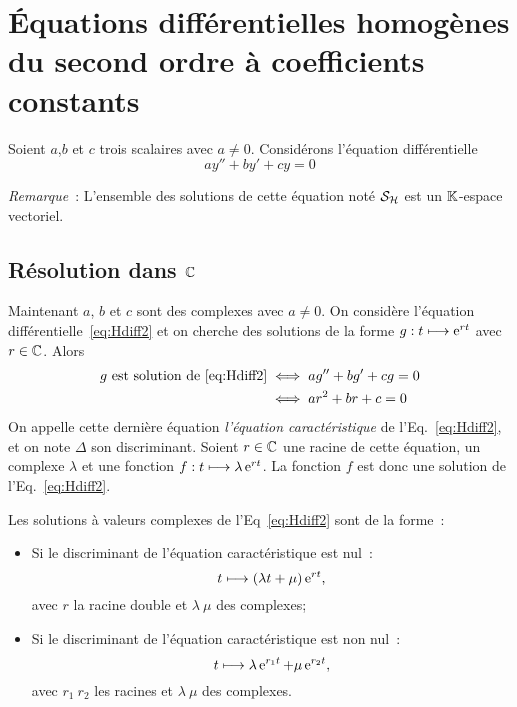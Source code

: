\section{Équations différentielles homogènes du second ordre à coefficients constants}
\label{sec:eqdiffsecondordrecoefconstants}
Soient $a$,$b$ et $c$ trois scalaires avec $a \neq 0$. Considérons l'équation différentielle
\begin{equation}
  \label{eq:Hdiff2}
  ay''+by'+cy=0
\end{equation}

\emph{Remarque}~: L'ensemble des solutions de cette équation noté $\mathcal{S}_{\mathcal{H}}$ est un $\mathbb{K}$-espace vectoriel.
%
\subsection{Résolution dans $\mathbb{C}$}
\label{subsec:resdansC}
Maintenant $a$, $b$ et $c$ sont des complexes avec $a \neq 0$. On considère l'équation différentielle~\eqref{eq:Hdiff2} et on cherche des solutions de la forme $g :t \longmapsto \operatorname{e}^{rt}$ avec $r \in \mathbb{C}$. Alors 
\begin{align}
  g\text{~est solution de } \eqref{eq:Hdiff2} & \iff ag'' + bg'+cg=0  \\ & \iff ar^2+br+c=0
\end{align}
On appelle cette dernière équation \emph{l'équation caractéristique} de l'Eq.~\eqref{eq:Hdiff2}, et on note $\Delta$ son discriminant. Soient $r \in \mathbb{C}$ une racine de cette équation, un complexe $\lambda$ et une fonction $f:t \longmapsto \lambda \operatorname{e}^{rt}$. La fonction $f$ est donc une solution de l'Eq.~\eqref{eq:Hdiff2}.
%
\begin{theo}
  \label{theo:5} 
  Les solutions à valeurs complexes de l'Eq~\eqref{eq:Hdiff2} sont de la forme~:
  \begin{itemize}
  \item Si le discriminant de l'équation caractéristique est nul~: 
    \begin{equation} 
      t \longmapsto (\lambda t + \mu)\operatorname{e}^{rt},
    \end{equation} 
    avec $r$ la racine double et $\lambda \ \mu$ des complexes;
  \item Si le discriminant de l'équation caractéristique est non nul~: 
    \begin{equation} 
      t \longmapsto \lambda \operatorname{e}^{r_1 t} + \mu \operatorname{e}^{r_2 t},
    \end{equation} 
    avec $r_1 \ r_2$ les racines et $\lambda \ \mu$ des complexes.
  \end{itemize}
\end{theo}
